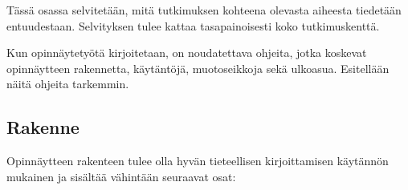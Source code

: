 \documentclass[english,12pt,a4paper,pdftex,sci,utf8]{aaltothesis}
\begin{document}
T\"ass\"a osassa selvitet\"a\"an, mit\"a tutkimuksen kohteena olevasta
aiheesta tiedet\"a\"an entuudestaan. Selvityksen tulee kattaa
tasapainoisesti koko tutkimuskentt\"a. 

Kun opinn\"aytety\"ot\"a kirjoitetaan, on noudatettava 
ohjeita, jotka koskevat opinn\"aytteen rakennetta,
k\"ayt\"ant\"oj\"a, muotoseikkoja sek\"a ulkoasua. Esitell\"a\"an n\"ait\"a
ohjeita tarkemmin.


\subsection*{Rakenne}

Opinn\"aytteen rakenteen tulee olla hyv\"an tieteellisen
kirjoittamisen k\"ayt\"ann\"on mukainen ja sis\"alt\"a\"a v\"ahint\"a\"an seuraavat
osat:
\end{document}
